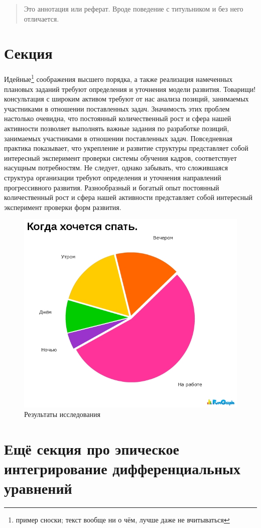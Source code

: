 \documentclass[14pt,final,titlepage]{hedsemwork}
\begin{document}
\subject{Электродинамика}
\maketitle
\begin{abstract}
    Это аннотация или реферат. Вроде поведение с титульником и без него
    отличается.
\end{abstract}
\tableofcontents
\section{Секция}
Идейные\footnote{пример сноски; текст вообще ни о чём, лучше даже не
вчитываться} соображения высшего порядка, а также реализация намеченных плановых заданий требуют определения и уточнения модели развития. Товарищи! консультация с широким активом требуют от нас анализа позиций, занимаемых участниками в отношении поставленных задач. Значимость этих проблем настолько очевидна, что постоянный количественный рост и сфера нашей активности позволяет выполнять важные задания по разработке позиций, занимаемых участниками в отношении поставленных задач. Повседневная практика показывает, что укрепление и развитие структуры представляет собой интересный эксперимент проверки системы обучения кадров, соответствует насущным потребностям. Не следует, однако забывать, что сложившаяся структура организации требуют определения и уточнения направлений прогрессивного развития. Разнообразный и богатый опыт постоянный количественный рост и сфера нашей активности представляет собой интересный эксперимент проверки форм развития.
\begin{figure}[t]
    \center
    \includegraphics[width=.47\textwidth]{1.jpg}
    \caption{Результаты исследования}
\end{figure}
\section{Ещё секция про эпическое интегрирование дифференциальных
уравнений}
\end{document}
